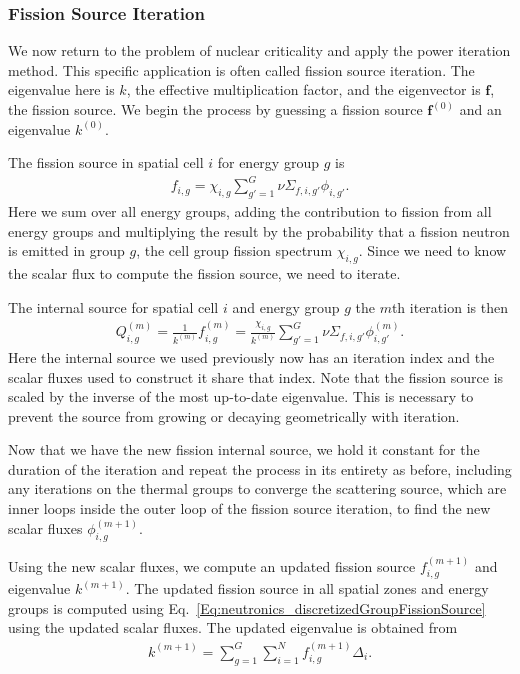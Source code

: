 \subsubsection{Fission Source Iteration}

We now return to the problem of nuclear criticality and apply the power iteration method. This specific application is often called fission source iteration. The eigenvalue here is $k$, the effective multiplication factor, and the eigenvector is $\mathbf{f}$, the fission source. We begin the process by guessing a fission source $\mathbf{f}^{(0)}$ and an eigenvalue $k^{(0)}$. 

The fission source in spatial cell $i$ for energy group $g$ is
\begin{align}
  f_{i,g} = \chi_{i,g} \sum_{g'=1}^G \nu\Sigma_{f,i,g'} \phi_{i,g'} . \label{Eq:neutronics_discretizedGroupFissionSource}
\end{align}
Here we sum over all energy groups, adding the contribution to fission from all energy groups and multiplying the result by the probability that a fission neutron is emitted in group $g$, the cell group fission spectrum $\chi_{i,g}$. Since we need to know the scalar flux to compute the fission source, we need to iterate.

The internal source for spatial cell $i$ and energy group $g$ the $m$th iteration is then
\begin{align}
  Q_{i,g}^{(m)} = \frac{1}{k^{(m)}} f_{i,g}^{(m)} = \frac{\chi_{i,g}}{k^{(m)}} \sum_{g'=1}^G \nu\Sigma_{f,i,g'} \phi_{i,g'}^{(m)} .
\end{align}
Here the internal source we used previously now has an iteration index and the scalar fluxes used to construct it share that index. Note that the fission source is scaled by the inverse of the most up-to-date eigenvalue. This is necessary to prevent the source from growing or decaying geometrically with iteration. 

Now that we have the new fission internal source, we hold it constant for the duration of the iteration and repeat the process in its entirety as before, including any iterations on the thermal groups to converge the scattering source, which are inner loops inside the outer loop of the fission source iteration, to find the new scalar fluxes $\phi_{i,g}^{(m+1)}$.

Using the new scalar fluxes, we compute an updated fission source $f_{i,g}^{(m+1)}$ and eigenvalue $k^{(m+1)}$. The updated fission source in all spatial zones and energy groups is computed using Eq.~\eqref{Eq:neutronics_discretizedGroupFissionSource} using the updated scalar fluxes. The updated eigenvalue is obtained from
\begin{align}
  k^{(m+1)} = \displaystyle\sum_{g=1}^G \sum_{i=1}^N f_{i,g}^{(m+1)} \Delta_i .
\end{align}

